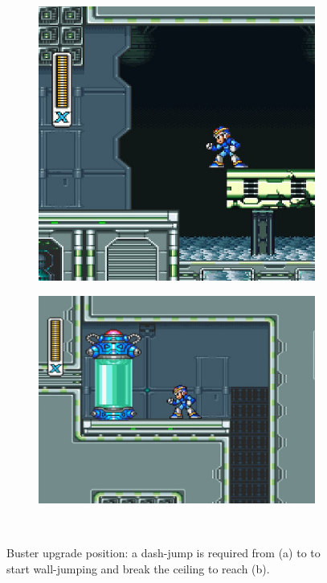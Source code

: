 \begin{figure}[h]
	\centering
	\begin{subfigure}{0.4\textwidth}
		\centering
		\includegraphics[width=\linewidth]{figures/X1/Flame_armor_1.jpg}
		\caption{}
	\end{subfigure}
	\begin{subfigure}{0.5\textwidth}
		\centering
		\includegraphics[width=\linewidth]{figures/X1/Flame_armor_2.jpg}
		\caption{}
	\end{subfigure}\\
	\caption{Buster upgrade position: a dash-jump is required from (a) to to start wall-jumping and break the ceiling to reach (b).}
\end{figure}

